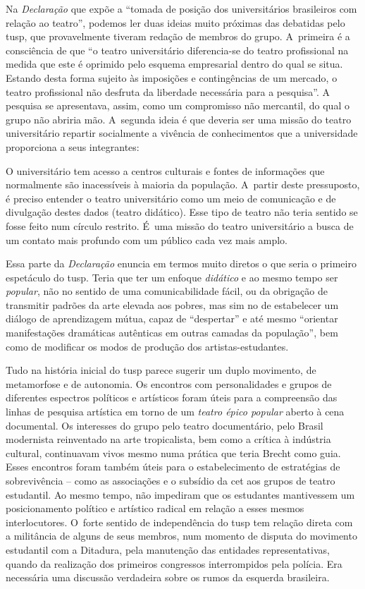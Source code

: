 Na {\it Declaração} que expõe a “tomada de posição dos universitários
brasileiros com relação ao teatro”, podemos ler duas ideias muito
próximas das debatidas pelo {\sc tusp}, que provavelmente tiveram redação de
membros do grupo. A~primeira é a consciência de que “o teatro
universitário diferencia-se do teatro profissional na medida que este é
oprimido pelo esquema empresarial dentro do qual se situa. Estando desta
forma sujeito às imposições e contingências de um mercado, o teatro
profissional não desfruta da liberdade necessária para a pesquisa”. A
pesquisa se apresentava, assim, como um compromisso não mercantil, do qual
o grupo não abriria mão. A~segunda ideia é que deveria ser uma missão do
teatro universitário repartir socialmente a vivência de conhecimentos
que a universidade proporciona a seus integrantes:

\startblockquote
O universitário tem acesso a centros culturais e fontes de informações
que normalmente são inacessíveis à maioria da população. A~partir deste
pressuposto, é preciso entender o teatro universitário como um meio de
comunicação e de divulgação destes dados (teatro didático). Esse tipo de
teatro não teria sentido se fosse feito num círculo restrito. É~uma
missão do teatro universitário a busca de um contato mais profundo com
um público cada vez mais amplo.
\stopblockquote

Essa parte da {\it Declaração} enuncia em termos muito diretos o que seria o
primeiro espetáculo do {\sc tusp}. Teria que ter um enfoque {\it didático} e
ao mesmo tempo ser {\it popular}, não no sentido de uma comunicabilidade
fácil, ou da obrigação de transmitir padrões da arte elevada aos pobres,
mas sim no de estabelecer um diálogo de aprendizagem mútua, capaz de
“despertar” e até mesmo “orientar manifestações dramáticas autênticas em
outras camadas da população”, bem como de modificar os modos de
produção dos artistas-estudantes.

Tudo na história inicial do {\sc tusp} parece sugerir um duplo movimento, de
metamorfose e de autonomia. Os encontros com personalidades e grupos de
diferentes espectros políticos e artísticos foram úteis para a
compreensão das linhas de pesquisa artística em torno de um {\it teatro
épico popular} aberto à cena documental. Os interesses do grupo pelo
teatro documentário, pelo Brasil modernista reinventado na arte
tropicalista, bem como a crítica à indústria cultural, continuavam vivos
mesmo numa prática que teria Brecht como guia. Esses encontros foram
também úteis para o estabelecimento de estratégias de sobrevivência --
como as associações e o subsídio da {\sc cet} aos grupos de teatro estudantil.
Ao mesmo tempo, não impediram que os estudantes mantivessem um
posicionamento político e artístico radical em relação a esses mesmos
interlocutores. O~forte sentido de independência do {\sc tusp} tem relação
direta com a militância de alguns de seus membros, num momento de
disputa do movimento estudantil com a Ditadura, pela manutenção das
entidades representativas, quando da realização dos primeiros congressos
interrompidos pela polícia. Era necessária uma discussão verdadeira
sobre os rumos da esquerda brasileira.

